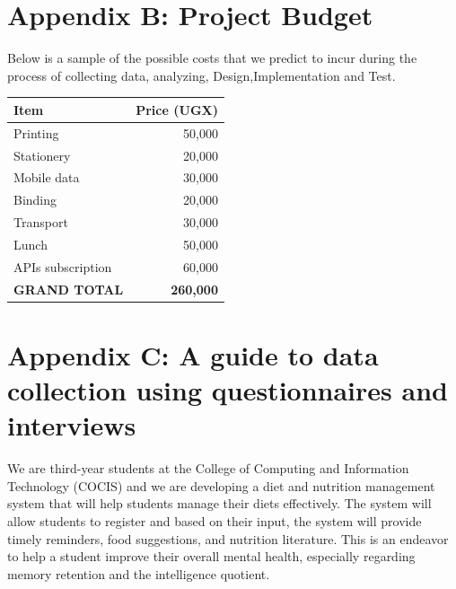 \documentclass{article}
\begin{document}
\newpage
\section{Appendix B: Project Budget}
Below is a sample of the possible costs that we predict to incur during the process of collecting data, analyzing, Design,Implementation and Test. \\

\begin{Large}
\begin{center}
\begin{tabular}{|l|r|}
\hline
\textbf{Item} & \textbf{Price (UGX)} \\ \hline
Printing & 50,000 \\ \hline
Stationery & 20,000 \\ \hline
Mobile data & 30,000 \\ \hline
Binding & 20,000 \\ \hline
Transport & 30,000 \\ \hline
Lunch & 50,000 \\ \hline
APIs subscription & 60,000 \\ \hline
\textbf{GRAND TOTAL} & \textbf{260,000} \\ \hline
\end{tabular}
\end{center}
\end{Large}

\newpage
\section{Appendix C: A guide to data collection using questionnaires and interviews}

We are third-year students at the College of Computing and Information Technology (COCIS) and we are developing a diet and nutrition management system that will help students manage their diets effectively. The system will allow students to register and based on their input, the system will provide timely reminders, food suggestions, and nutrition literature. This is an endeavor to help a student improve their overall mental health, especially regarding memory retention and the intelligence quotient.
\end{document}
